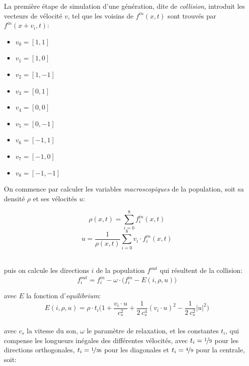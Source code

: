 La première étape de simulation d'une génération, dite de \textit{collision}, introduit les vecteurs de vélocité $v$,  tel que les voisins de $f^{in}(x, t)$ sont trouvés par $f^{in}(x+v_i,t)$: 
\begin{multicols}{3}
\begin{itemize}
\item[] $v_0 = [1,1]$
\item[] $v_1 = [1,0]$
\item[] $v_2 = [1,-1]$
\item[] $v_3 = [0,1]$
\item[] $v_4 = [0,0]$
\item[] $v_5 = [0,-1]$
\item[] $v_6 = [-1,1]$
\item[] $v_7 = [-1,0]$
\item[] $v_8 = [-1,-1]$
\end{itemize}
\end{multicols}

On commence par calculer les variables \textit{macroscopiques} de la population, soit sa densité $\rho$ et ses vélocités $u$:\\[-2\baselineskip]
\begin{multicols}{2}
\begin{equation}
\rho(x, t) = \sum_{i=0}^{8} f^{in}_i(x,t)
\end{equation}
\begin{equation}
u = \frac{1}{\rho(x,t)}\sum_{i=0}^{8} v_i \cdot f^{in}_i(x,t)
\end{equation}
\end{multicols}~\\[-0.5\baselineskip]
\noindent puis on calcule les directions $i$ de la population $f^{out}$ qui résultent de la collision:
\begin{equation}
f^{out}_i = f^{in}_i - \omega \cdot \big(f^{in}_i - E(i, \rho, u) \big)
\end{equation}

\noindent avec $E$ la fonction d'\textit{equilibrium}:
\begin{equation}
E(i, \rho, u) = \rho\cdot t_i \bigg(  1 + \frac{v_i \cdot u}{c^2_s} + \frac{1}{2~c^4_s} (v_i \cdot u)^2 - \frac{1}{2~c^2_s} |u|^2 \bigg)
\end{equation}\\[-\baselineskip]

\noindent avec $c_s$ la vitesse du son, $\omega$ le paramètre de relaxation, et les constantes $t_i$, qui compense les longueurs inégales des différentes vélocités, avec $t_i = \nicefrac{1}{9}$ pour les directions orthogonales, $t_i =\nicefrac{1}{36}$ pour les diagonales et $t_i=\nicefrac{4}{9}$ pour la centrale, soit:

